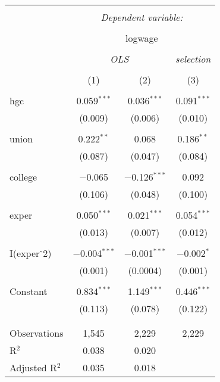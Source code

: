 \documentclass{article}
\begin{document}
\begin{table}[!htbp] \centering 
  \caption{} 
  \label{} 
\begin{tabular}{@{\extracolsep{5pt}}lccc} 
\\[-1.8ex]\hline 
\hline \\[-1.8ex] 
 & \multicolumn{3}{c}{\textit{Dependent variable:}} \\ 
\cline{2-4} 
\\[-1.8ex] & \multicolumn{3}{c}{logwage} \\ 
\\[-1.8ex] & \multicolumn{2}{c}{\textit{OLS}} & \textit{selection} \\ 
\\[-1.8ex] & (1) & (2) & (3)\\ 
\hline \\[-1.8ex] 
 hgc & 0.059$^{***}$ & 0.036$^{***}$ & 0.091$^{***}$ \\ 
  & (0.009) & (0.006) & (0.010) \\ 
  & & & \\ 
 union & 0.222$^{**}$ & 0.068 & 0.186$^{**}$ \\ 
  & (0.087) & (0.047) & (0.084) \\ 
  & & & \\ 
 college & $-$0.065 & $-$0.126$^{***}$ & 0.092 \\ 
  & (0.106) & (0.048) & (0.100) \\ 
  & & & \\ 
 exper & 0.050$^{***}$ & 0.021$^{***}$ & 0.054$^{***}$ \\ 
  & (0.013) & (0.007) & (0.012) \\ 
  & & & \\ 
 I(exper$\hat{\mkern6mu}$2) & $-$0.004$^{***}$ & $-$0.001$^{***}$ & $-$0.002$^{*}$ \\ 
  & (0.001) & (0.0004) & (0.001) \\ 
  & & & \\ 
 Constant & 0.834$^{***}$ & 1.149$^{***}$ & 0.446$^{***}$ \\ 
  & (0.113) & (0.078) & (0.122) \\ 
  & & & \\ 
\hline \\[-1.8ex] 
Observations & 1,545 & 2,229 & 2,229 \\ 
R$^{2}$ & 0.038 & 0.020 &  \\ 
Adjusted R$^{2}$ & 0.035 & 0.018 &  \\ 

\end{tabular}
\end{table}
\end{document}

